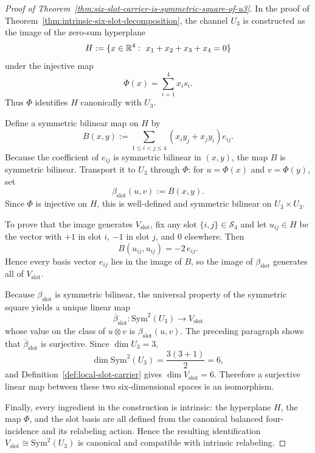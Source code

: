 \begin{proof}[Proof of Theorem~\ref{thm:six-slot-carrier-is-symmetric-square-of-u3}]
\label{proof:thm:six-slot-carrier-is-symmetric-square-of-u3}
In the proof of Theorem~\ref{thm:intrinsic-six-slot-decomposition}, the channel
\(U_3\) is constructed as the image of the zero-sum hyperplane
\[
H:=\{x\in\mathbb{R}^4:\ x_1+x_2+x_3+x_4=0\}
\]
under the injective map
\[
\Phi(x)=\sum_{i=1}^4 x_i s_i.
\]
Thus \(\Phi\) identifies \(H\) canonically with \(U_3\).

Define a symmetric bilinear map on \(H\) by
\[
B(x,y):=\sum_{1\le i<j\le 4}(x_i y_j+x_j y_i)e_{ij}.
\]
Because the coefficient of \(e_{ij}\) is symmetric bilinear in \((x,y)\), the
map \(B\) is symmetric bilinear. Transport it to \(U_3\) through \(\Phi\): for
\(u=\Phi(x)\) and \(v=\Phi(y)\), set
\[
\beta_{\mathrm{slot}}(u,v):=B(x,y).
\]
Since \(\Phi\) is injective on \(H\), this is well-defined and symmetric
bilinear on \(U_3\times U_3\).

To prove that the image generates \(V_{\mathrm{slot}}\), fix any slot
\(\{i,j\}\in\mathcal S_4\) and let \(u_{ij}\in H\) be the vector with \(+1\) in
slot \(i\), \(-1\) in slot \(j\), and \(0\) elsewhere. Then
\[
B(u_{ij},u_{ij})=-2\,e_{ij}.
\]
Hence every basis vector \(e_{ij}\) lies in the image of \(B\), so the image of
\(\beta_{\mathrm{slot}}\) generates all of \(V_{\mathrm{slot}}\).

Because \(\beta_{\mathrm{slot}}\) is symmetric bilinear, the universal property
of the symmetric square yields a unique linear map
\[
\overline\beta_{\mathrm{slot}}:\mathrm{Sym}^2(U_3)\to V_{\mathrm{slot}}
\]
whose value on the class of \(u\otimes v\) is \(\beta_{\mathrm{slot}}(u,v)\).
The preceding paragraph shows that \(\overline\beta_{\mathrm{slot}}\) is
surjective. Since \(\dim U_3=3\),
\[
\dim \mathrm{Sym}^2(U_3)=\frac{3(3+1)}2=6,
\]
and Definition~\ref{def:local-slot-carrier} gives \(\dim V_{\mathrm{slot}}=6\).
Therefore a surjective linear map between these two six-dimensional spaces is
an isomorphism.

Finally, every ingredient in the construction is intrinsic: the hyperplane
\(H\), the map \(\Phi\), and the slot basis are all defined from the canonical
balanced four-incidence and its relabeling action. Hence the resulting
identification \(V_{\mathrm{slot}}\cong \mathrm{Sym}^2(U_3)\) is canonical and
compatible with intrinsic relabeling.
\end{proof}

